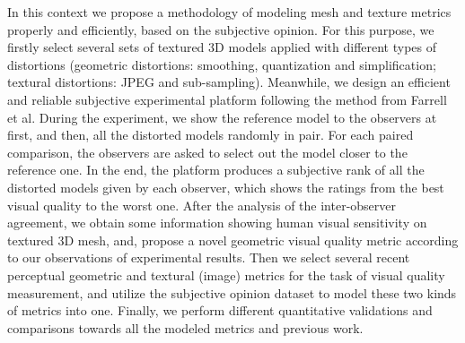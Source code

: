 In this context we propose a methodology of modeling mesh and texture metrics properly and efficiently, based on the subjective opinion. For this purpose, we firstly select several sets of textured 3D models applied with different types of distortions (geometric distortions: smoothing, quantization and simplification; textural distortions: JPEG and sub-sampling). Meanwhile, we design an efficient and reliable subjective experimental platform following the method from Farrell et al\cite{Farrell_2001}. During the experiment, we show the reference model to the observers at first, and then, all the distorted models randomly in pair. For each paired comparison, the observers are asked to select out the model closer to the reference one. In the end, the platform produces a subjective rank of all the distorted models given by each observer, which shows the ratings from the best visual quality to the worst one. After the analysis of the inter-observer agreement, we obtain some information showing human visual sensitivity on textured 3D mesh, and, propose a novel geometric visual quality metric according to our observations of experimental results. Then we select several recent perceptual geometric and textural (image) metrics for the task of visual quality measurement, and utilize the subjective opinion dataset to model these two kinds of metrics into one. Finally, we perform different quantitative validations and comparisons towards all the modeled metrics and previous work.